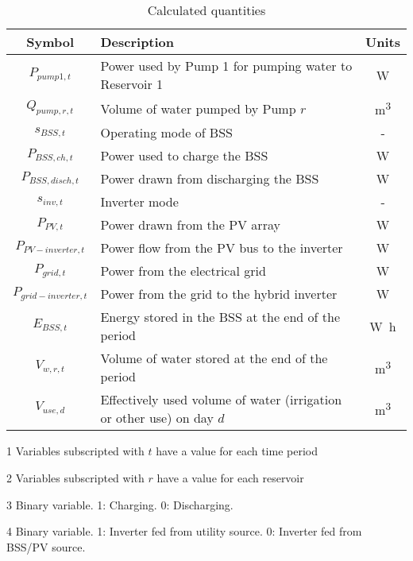 \begin{table}[t]
	\begin{threeparttable}[b]
		\caption{Calculated quantities}
		\label{table:calculated}
		\begin{tabular}{cp{}c}
			\toprule 
			Symbol & Description & Units \\
			\midrule
			$P_{pump1,t}$ & Power used by Pump 1 for pumping water to Reservoir 1 & \si{W} \\
			$Q_{pump,r,t}$ & Volume of water pumped by Pump $r$ & \si{m^3} \\
			$s_{BSS,t}$ & Operating mode of BSS\tnote{4} & - \\
			$P_{BSS,ch,t}$ & Power used to charge the BSS & \si{W} \\
			$P_{BSS,disch,t}$ & Power drawn from discharging the BSS & \si{W} \\
			$s_{inv,t}$ & Inverter mode\tnote{5} & - \\
			$P_{PV,t}$ & Power drawn from the PV array & \si{W} \\
			$P_{PV-inverter,t}$ & Power flow from the PV bus to the inverter & \si{W} \\
			$P_{grid,t}$ & Power from the electrical grid & \si{W} \\
			$P_{grid-inverter,t}$ & Power from the grid to the hybrid inverter & \si{W} \\
			$E_{BSS,t}$ & Energy stored in the BSS at the end of the period & \si{W h} \\
			$V_{w,r,t}$ & Volume of water stored at the end of the period & \si{m^3} \\
			$V_{use,d}$ & Effectively used volume of water (irrigation or other use) on day $d$ & \si{m^3} \\
			\bottomrule
		\end{tabular}
		\begin{tablenotes}
			\footnotesize
			\item [1] Variables subscripted with $t$ have a value for each time period
			\item [2] Variables subscripted with $r$ have a value for each reservoir
			\item [3] Binary variable. 1: Charging. 0: Discharging.
			\item [4] Binary variable. 1: Inverter fed from utility source. 0: Inverter fed from BSS/PV source.
		\end{tablenotes}
	\end{threeparttable}
\end{table}


